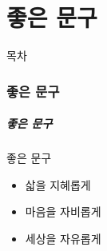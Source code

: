 \documentclass[aspectratio=1610,20pt,xcolor=pdftex,dvipsnames,table,handout]{beamer}
\begin{document}
		\begin{frame} [t,plain]
		\end{frame}						




		\part{좋은 문구}
		\frame{\partpage}
		
\label{part4} 	%

		\begin{frame} [plain]{목차}
		\tableofcontents%
		\end{frame}

		\begin{frame} [t,plain]
		\end{frame}						
		\begin{frame} [t,plain]
		\end{frame}						



		\section{좋은 문구}

		\begin{frame} [t,plain]
		\frametitle{좋은 문구}
			\begin{block} {좋은 문구}
			\setlength{\leftmargini}{2em}			
			\begin{itemize}
				\item 삷을 지혜롭게
				\item 마음을 자비롭게
				\item 세상을 자유롭게

			\end{itemize}
			\end{block}						
		\end{frame}						
\end{document}
